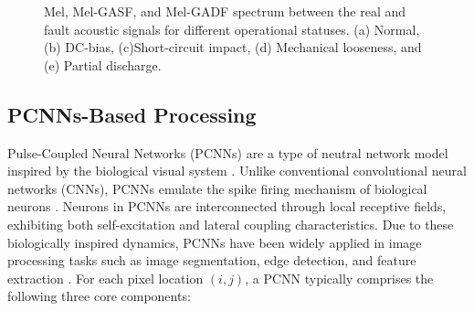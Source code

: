 \documentclass[final,5p,times,twocolumn]{elsarticle}
\begin{document}
\begin{figure}[htbp]
	\caption{Mel, Mel-GASF, and Mel-GADF spectrum between the real and fault acoustic signals for different operational statuses. (a) Normal, (b) DC-bias, (c)Short-circuit impact, (d) Mechanical looseness, and (e) Partial discharge.}
	\label{fig4}
\end{figure}

\subsection{PCNNs-Based Processing}
Pulse-Coupled Neural Networks (PCNNs) are a type of neutral network model inspired by the biological visual system \cite{4305279,6338347}. Unlike conventional convolutional neural networks (CNNs), PCNNs emulate the spike firing mechanism of biological neurons \cite{10341267}. Neurons in PCNNs are interconnected through local receptive fields, exhibiting both self-excitation and lateral coupling characteristics. Due to these biologically inspired dynamics, PCNNs have been widely applied in image processing tasks such as image segmentation, edge detection, and feature extraction \cite{10848019}.
\noindent For each pixel location \((i, j)\), a PCNN typically comprises the following three core components:
\end{document}

